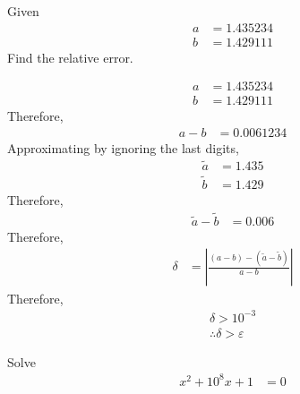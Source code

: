 \documentclass[fleqn, a4paper, 12pt, twoside, titlepage]{article}
\theoremstyle{definition}
\theoremstyle{theorem}
\renewcommand{\tilde}{\widetilde}
\begin{document}
\begin{question}
	Given
	\begin{align*}
		a & = 1.435234 \\
		b & = 1.429111
	\end{align*}
	Find the relative error.
\end{question}

\begin{solution}
	\begin{align*}
		a & = 1.435234 \\
		b & = 1.429111
	\end{align*}
	Therefore,
	\begin{align*}
		a - b & = 0.0061234
	\end{align*}
	Approximating by ignoring the last digits,
	\begin{align*}
		\tilde{a} & = 1.435 \\
		\tilde{b} & = 1.429
	\end{align*}
	Therefore,
	\begin{align*}
		\tilde{a} - \tilde{b} & = 0.006
	\end{align*}
	Therefore,
	\begin{align*}
		\delta & = \left| \frac{\left( a - b \right) - \left( \tilde{a} - \tilde{b} \right)}{a - b} \right|
	\end{align*}
	Therefore,
	\begin{align*}
		\delta > 10^{-3} \\
		\therefore \delta > \varepsilon
	\end{align*}
\end{solution}

\begin{question}
	Solve
	\begin{align*}
		x^2 + 10^8 x + 1 & = 0
	\end{align*}
\end{question}
\end{document}
